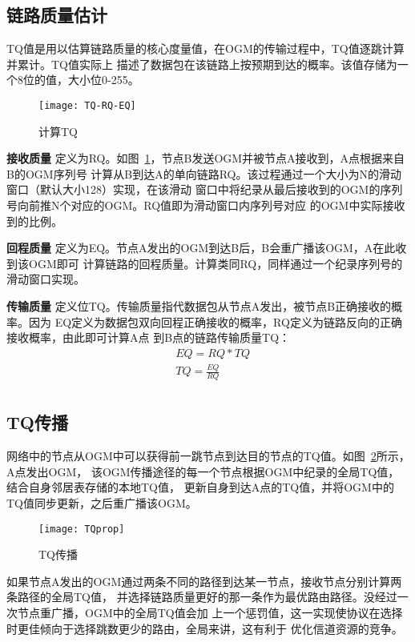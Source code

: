 \subsection{链路质量估计}
TQ值是用以估算链路质量的核心度量值，在OGM的传输过程中，TQ值逐跳计算并累计。TQ值实际上
描述了数据包在该链路上按预期到达的概率。该值存储为一个8位的值，大小位0-255。

\begin{figure}[H] %
  \centering
  \texttt{[image: TQ-RQ-EQ]}
  \caption{计算TQ}
  \label{fig:TQ-RQ-EQ}
\end{figure}

\textbf{接收质量} 定义为RQ。如图~\ref{fig:TQ-RQ-EQ}，节点B发送OGM并被节点A接收到，A点根据来自B的OGM序列号
计算从B到达A的单向链路RQ。该过程通过一个大小为N的滑动窗口（默认大小128）实现，在该滑动
窗口中将纪录从最后接收到的OGM的序列号向前推N个对应的OGM。RQ值即为滑动窗口内序列号对应
的OGM中实际接收到的比例。

\textbf{回程质量} 定义为EQ。节点A发出的OGM到达B后，B会重广播该OGM，A在此收到该OGM即可
计算链路的回程质量。计算类同RQ，同样通过一个纪录序列号的滑动窗口实现。

\textbf{传输质量} 定义位TQ。传输质量指代数据包从节点A发出，被节点B正确接收的概率。因为
EQ定义为数据包双向回程正确接收的概率，RQ定义为链路反向的正确接收概率，由此即可计算A点
到B点的链路传输质量TQ：
\begin{equation}
\begin{split}
&EQ=RQ*TQ\\
&TQ=\frac{EQ}{RQ}\\
\end{split}
\end{equation}

\subsection{TQ传播}
网络中的节点从OGM中可以获得前一跳节点到达目的节点的TQ值。如图~\ref{fig:TQprop}所示，A点发出OGM，
该OGM传播途径的每一个节点根据OGM中纪录的全局TQ值，结合自身邻居表存储的本地TQ值，
更新自身到达A点的TQ值，并将OGM中的TQ值同步更新，之后重广播该OGM。

\begin{figure}[H] %
  \centering
  \texttt{[image: TQprop]}
  \caption{TQ传播}
  \label{fig:TQprop}
\end{figure}

如果节点A发出的OGM通过两条不同的路径到达某一节点，接收节点分别计算两条路径的全局TQ值，
并选择链路质量更好的那一条作为最优路由路径。没经过一次节点重广播，OGM中的全局TQ值会加
上一个惩罚值，这一实现使协议在选择时更佳倾向于选择跳数更少的路由，全局来讲，这有利于
优化信道资源的竞争。

